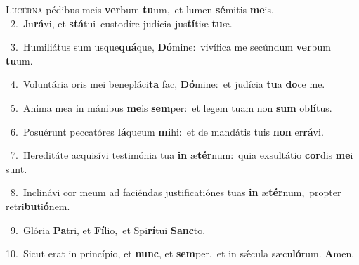 \lettrine{\initial\textcolor{\initialcolor}{L}}{ucérna} pédibus meis \textbf{ver}\-bum \textbf{tu}\-um,~\star et lumen \textbf{sé}\-mitis \textbf{me}\-is.\\
{\numbfont\textcolor{\numbcolor}{~2.}}~Ju\-\textbf{rá}\-vi, et \textbf{stá}\-tui~\star custodíre judícia jus\-\textbf{tí}\-tiæ \textbf{tu}\-æ.\par
{\numbfont\textcolor{\numbcolor}{~3.}}~Humiliátus sum usque\-\textbf{quá}\-que, \textbf{Dó}\-mine:~\star vivífica me secúndum \textbf{ver}\-bum \textbf{tu}\-um.\par
{\numbfont\textcolor{\numbcolor}{~4.}}~Voluntária oris mei benepláci\textbf{ta} fac, \textbf{Dó}\-mine:~\star et judícia \textbf{tu}\-a \textbf{do}\-ce me.\par
{\numbfont\textcolor{\numbcolor}{~5.}}~Anima mea in mánibus \textbf{me}\-is \textbf{sem}\-per:~\star et legem tuam non \textbf{sum} ob\-\textbf{lí}\-tus.\par
{\numbfont\textcolor{\numbcolor}{~6.}}~Posuérunt peccatóres \textbf{lá}\-queum \textbf{mi}\-hi:~\star et de mandátis tuis \textbf{non} er\-\textbf{rá}\-vi.\par
{\numbfont\textcolor{\numbcolor}{~7.}}~Hereditáte acquisívi testimónia tua \textbf{in} æ\-\textbf{tér}\-num:~\star quia exsultátio \textbf{cor}\-dis \textbf{me}\-i sunt.\par
{\numbfont\textcolor{\numbcolor}{~8.}}~Inclinávi cor meum ad faciéndas justificatiónes tuas \textbf{in} æ\-\textbf{tér}\-num,~\star propter retri\-\textbf{bu}\-ti\-\textbf{ó}\-nem.\par
{\numbfont\textcolor{\numbcolor}{~9.}}~Glória \textbf{Pa}\-tri, et \textbf{Fí}\-lio,~\star et Spi\-\textbf{rí}\-tui \textbf{Sanc}\-to.\par
{\numbfont\textcolor{\numbcolor}{10.}}~Sicut erat in princípio, et \textbf{nunc}\-, et \textbf{sem}\-per,~\star et in sǽcula sæcu\-\textbf{ló}\-rum. \textbf{A}\-men.\par
